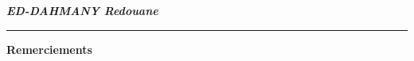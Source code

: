 \documentclass[12pt, a4paper, openany]{report}
\begin{document}
\vspace{0.6cm}

\begin{flushright}
    {\fontsize{14}{16}\selectfont\textit{\textbf{ED-DAHMANY Redouane}}}
\end{flushright}

\vspace{0.1cm}


\newpage
\thispagestyle{frontmatter} %

\vspace*{0.5cm} %


\noindent
\textcolor{royalBlue}{\rule{0.55\textwidth}{1pt}}
\hfill
{\fontsize{24}{28}\selectfont\color{royalBlue}\bfseries Remerciements}

\vspace{0.0cm}
\end{document}
